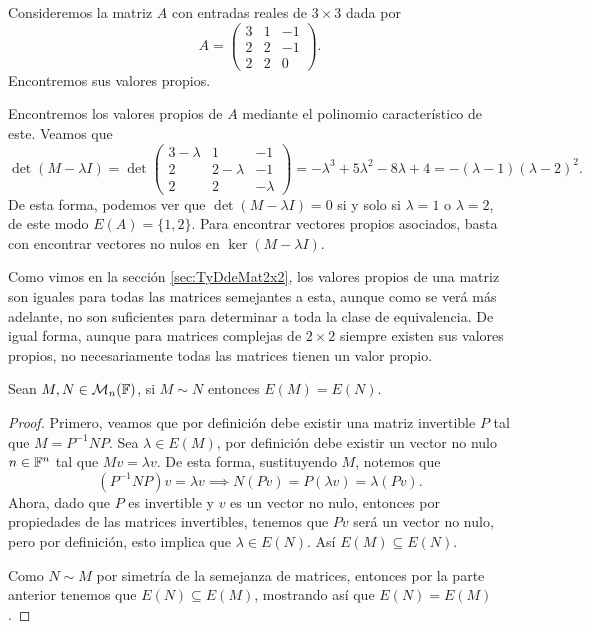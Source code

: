 \begin{example}
  Consideremos la matriz $A$ con entradas reales de $3 \times 3$ dada por
  \[
    A = \begin{pmatrix} 3 & 1 & -1 \\ 2 & 2 & -1 \\ 2 & 2 & 0 \end{pmatrix}.
  \]
  Encontremos sus valores propios.

  \examplesolution

  Encontremos los valores propios de $A$ mediante el polinomio característico de este. Veamos que
  \[
    \det(M - \lambda I) = \det\begin{pmatrix} 3 - \lambda & 1 & -1 \\ 2 & 2 - \lambda & -1 \\ 2 & 2 & -\lambda \end{pmatrix}
      = -\lambda^3+5\lambda^2-8\lambda+4 = -(\lambda-1)(\lambda-2)^2.
  \]
  De esta forma, podemos ver que $\det(M - \lambda I) = 0$ si y solo si $\lambda=1$ o $\lambda = 2$, de este modo $E(A) = \{1, 2\}$. Para encontrar vectores propios asociados, basta con encontrar vectores no nulos en $\ker(M-\lambda I)$.
\end{example}

Como vimos en la sección \ref{sec:TyDdeMat2x2}, los valores propios de una matriz son iguales para todas las matrices semejantes a esta, aunque como se verá más adelante, no son suficientes para determinar a toda la clase de equivalencia. De igual forma, aunque para matrices complejas de $2\times 2$ siempre existen sus valores propios, no necesariamente todas las matrices tienen un valor propio.

\begin{teor}\label{teor:SemEspectro}
  Sean $M,N \in \mathcal{M}_n(\mathbb{F})$, si $M \sim N$ entonces $E(M) = E(N)$.
\end{teor}
\begin{proof}
  Primero, veamos que por definición debe existir una matriz invertible $P$ tal que $M = P^{-1} N P$. Sea $\lambda \in E(M)$, por definición debe existir un vector no nulo $n \in \mathbb{F}^n$ tal que $Mv = \lambda v$. De esta forma, sustituyendo $M$, notemos que
    \[ ( P^{-1} N P) v =  \lambda v  \implies  N(Pv) = P(\lambda v) = \lambda (Pv). \]
  Ahora, dado que $P$ es invertible y $v$ es un vector no nulo, entonces por propiedades de las matrices invertibles, tenemos que $Pv$ será un vector no nulo, pero por definición, esto implica que $\lambda \in E(N)$. Así $E(M) \subseteq E(N)$.

  Como $N \sim M$ por simetría de la semejanza de matrices, entonces por la parte anterior tenemos que $E(N) \subseteq E(M)$, mostrando así que $E(N) = E(M)$.
\end{proof}